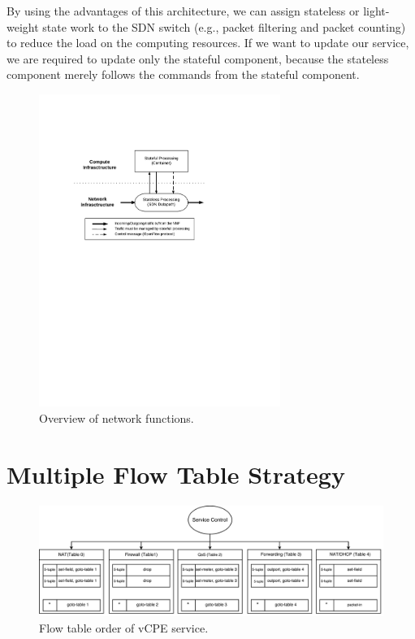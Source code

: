 By using the advantages of this architecture, we can assign stateless or light-weight state work to the SDN switch (e.g., packet filtering and packet counting) to reduce the load on the computing resources.
If we want to update our service, we are required to update only the stateful component, because the stateless component merely follows the commands from the stateful component.
\begin{figure}[!t]
\centering
\includegraphics[width=0.7\textwidth]{./fig/nfv_overview}
\caption{Overview of network functions.}
\label{fig:nfv_overview}
\end{figure}


\section{Multiple Flow Table Strategy} \label{sec:multi_flow_table_strategy}

\begin{figure}
\centering
\includegraphics[width=1.1\textwidth]{./fig/mft_table_overview}
\caption{Flow table order of vCPE service.}
\label{fig:mft_table_overview}
\end{figure}

